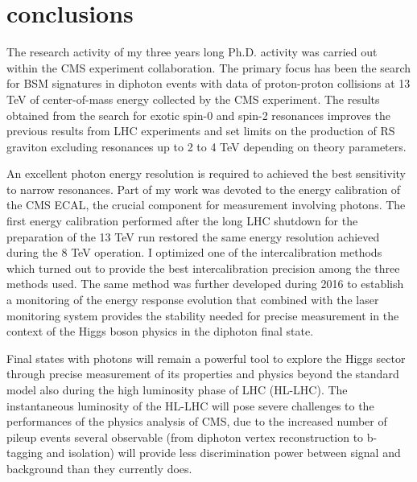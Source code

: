 \chapter{conclusions}
\label{chapter:conclusions}

The research activity of my three years long Ph.D. activity was carried out within the
CMS experiment collaboration. The primary focus has been the search for BSM signatures in
diphoton events with data of proton-proton collisions at 13 TeV of center-of-mass energy collected by the CMS experiment.
The results obtained from the search for exotic spin-0 and spin-2 resonances improves the previous results
from LHC experiments and set limits on the production of RS graviton excluding resonances up to 2 to 4 TeV depending
on theory parameters.

An excellent photon energy resolution is required to achieved the best sensitivity to narrow resonances. Part
of my work was devoted to the energy calibration of the CMS ECAL, the crucial component for measurement involving
photons. The first energy calibration performed after the long LHC shutdown for the preparation of the 13 TeV run
restored the same energy resolution achieved during the 8 TeV operation. I optimized one of the
intercalibration methods which turned out to provide the best intercalibration precision among
the three methods used. The same method was further developed during 2016 to establish a monitoring of
the energy response evolution that combined with the laser monitoring system provides the stability needed
for precise measurement in the context of the Higgs boson physics in the diphoton final state.

Final states with photons will remain a powerful tool to explore the Higgs sector through precise
measurement of its properties and physics beyond the standard model also during the high luminosity phase
of LHC (HL-LHC). The instantaneous luminosity of the HL-LHC will pose severe challenges to the performances of
the physics analysis of CMS, due to the increased number of pileup events several observable (from diphoton
vertex reconstruction to b-tagging and isolation) will provide less discrimination power between signal
and background than they currently does.

